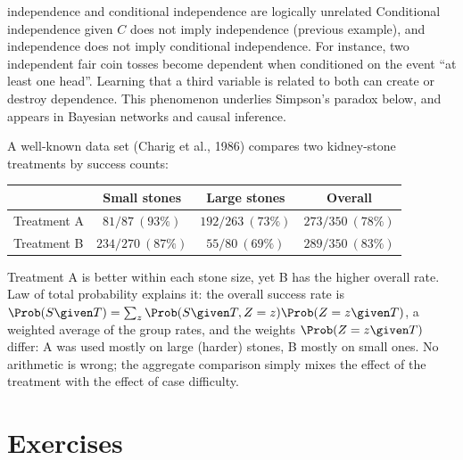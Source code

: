 \begin{nuance}{independence and conditional independence are logically unrelated}
Conditional independence given $C$ does not imply independence (previous
example), and independence does not imply conditional independence. For
instance, two independent fair coin tosses become dependent when conditioned
on the event ``at least one head''. Learning that a third variable is
related to both can create or destroy dependence. This phenomenon underlies
Simpson's paradox below, and appears in Bayesian networks and causal inference.
\end{nuance}

\begin{example}\label{ex:simpson}
A well-known data set (Charig et al., 1986) compares two kidney-stone
treatments by success counts:
\begin{center}
\begin{tabular}{@{}lccc@{}}
\toprule
 & Small stones & Large stones & Overall\\
\midrule
Treatment A & $81/87\ (93\%)$ & $192/263\ (73\%)$ & $273/350\ (78\%)$\\
Treatment B & $234/270\ (87\%)$ & $55/80\ (69\%)$ & $289/350\ (83\%)$\\
\bottomrule
\end{tabular}
\end{center}
Treatment A is better within each stone size, yet B has the higher overall rate.
Law of total probability explains it: the overall success rate is
$\Prob(S\given T)=\sum_z\Prob(S\given T,Z=z)\Prob(Z=z\given T)$, a weighted
average of the group rates, and the weights $\Prob(Z=z\given T)$ differ: A was
used mostly on large (harder) stones, B mostly on small ones. No arithmetic is
wrong; the aggregate comparison simply mixes the effect of the treatment with
the effect of case difficulty.
\end{example}

\section*{Exercises}

